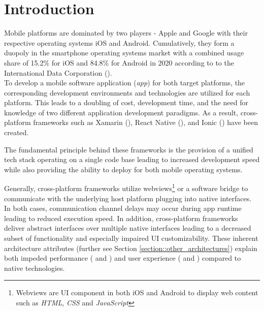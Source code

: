 \chapter{Introduction}
\label{section:introduction}
Mobile platforms are dominated by two players - Apple and Google with their respective operating systems iOS and Android. 
Cumulatively, they form a duopoly in the smartphone operating systems market with a combined usage share of 
15.2\% for iOS and 84.8\% for Android in 2020 according to to the International Data Corporation (\cite{IDC2021}).
\\To develop a mobile software application (\textit{app}) for both target platforms, the corresponding development environments and technologies 
are utilized for each platform. This leads to a doubling of cost, development time, and 
the need for knowledge of two different application development paradigms. 
As a result, cross-platform frameworks such as Xamarin (\cite{Xamarin2021}), React Native (\cite{Facebook2021}), and Ionic (\cite{Ionic2021}) have been created. 

The fundamental principle behind these frameworks is the provision of a unified tech stack operating on a single code base leading to increased development speed
while also providing the ability to deploy for both mobile operating systems.

Generally, cross-platform frameworks utilize webviews\footnote{Webviews are UI component in both iOS and Android to display web content such as \textit{HTML}, \textit{CSS} and \textit{JavaScript}} or a software bridge to communicate with the underlying host platform plugging into 
native interfaces. In both cases, communication channel delays may occur during app runtime leading to reduced execution speed. In addition, 
cross-platform frameworks deliver abstract interfaces over multiple native interfaces leading to a decreased subset of functionality
and especially impaired UI customizability. These inherent architecture attributes (further see Section \ref{section::other_architectures}) explain
both impeded performance (\cite{Ebone2018} and \cite{Corbalan2019}) and user experience (\cite{Mercado2016} and \cite{Angulo2014}) compared to native technologies.

